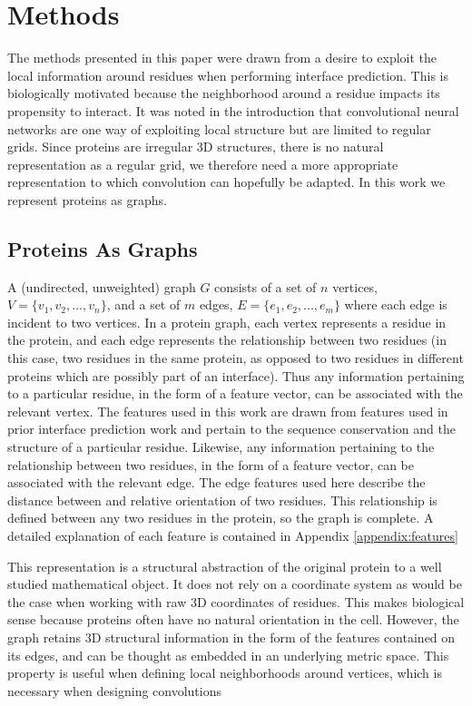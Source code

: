 \chapter{Methods}
\label{chap:methods}

The methods presented in this paper were drawn from a desire to exploit the local information around residues when performing interface prediction. 
This is biologically motivated because the neighborhood around a residue impacts its propensity to interact.
It was noted in the introduction that convolutional neural networks are one way of exploiting local structure but are limited to regular grids. 
Since proteins are irregular 3D structures, there is no natural representation as a regular grid, we therefore need a more appropriate representation to which convolution can hopefully be adapted.
In this work we represent proteins as graphs.


\section{Proteins As Graphs}

A (undirected, unweighted) graph $G$ consists of a set of $n$ vertices, $V=\{v_1, v_2, ..., v_n\}$, and a set of $m$ edges, $E=\{e_1, e_2, ..., e_m\}$ where each edge is incident to two vertices.
In a protein graph, each vertex represents a residue in the protein, and each edge represents the relationship between two residues (in this case, two residues in the same protein, as opposed to two residues in different proteins which are possibly part of an interface).
Thus any information pertaining to a particular residue, in the form of a feature vector, can be associated with the relevant vertex.
The features used in this work are drawn from features used in prior interface prediction work \cite{minhas2014} and pertain to the sequence conservation and the structure of a particular residue. 
Likewise, any information pertaining to the relationship between two residues, in the form of a feature vector, can be associated with the relevant edge.
The edge features used here describe the distance between and relative orientation of two residues.
This relationship is defined between any two residues in the protein, so the graph is complete. 
A detailed explanation of each feature is contained in Appendix \ref{appendix:features}

This representation is a structural abstraction of the original protein to a well studied mathematical object.
It does not rely on a coordinate system as would be the case when working with raw 3D coordinates of residues.
This makes biological sense because proteins often have no natural orientation in the cell.
However, the graph retains 3D structural information in the form of the features contained on its edges, and can be thought as embedded in an underlying metric space. 
This property is useful when defining local neighborhoods around vertices, which is necessary when designing convolutions

